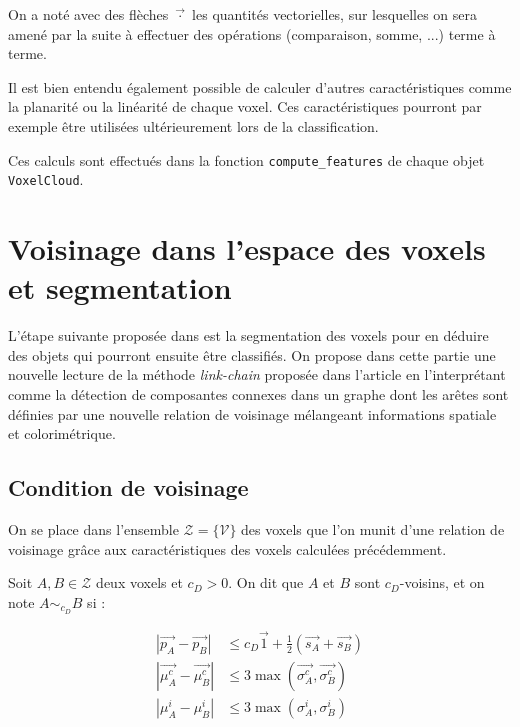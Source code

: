 \documentclass[a4paper, onecolumn, 11pt]{article}
\begin{document}
On a noté avec des flèches $\overrightarrow{\cdot}$ les quantités vectorielles, sur lesquelles on sera amené par la suite à effectuer des opérations (comparaison, somme, ...) terme à terme.

Il est bien entendu également possible de calculer d'autres caractéristiques comme la planarité ou la linéarité de chaque voxel. Ces caractéristiques pourront par exemple être utilisées ultérieurement lors de la classification.

Ces calculs sont effectués dans la fonction \texttt{compute\_features} de chaque objet \texttt{VoxelCloud}.

\section{Voisinage dans l'espace des voxels et segmentation}
L'étape suivante proposée dans \cite{aka_article} est la segmentation des voxels pour en déduire des objets qui pourront ensuite être classifiés. On propose dans cette partie une nouvelle lecture de la méthode \emph{link-chain} proposée dans l'article en l'interprétant comme la détection de composantes connexes dans un graphe dont les arêtes sont définies par une nouvelle relation de voisinage mélangeant informations spatiale et colorimétrique. 


\subsection{Condition de voisinage}
\label{condvoisinage}
On se place dans l'ensemble $\mathcal{Z} = \{\mathcal{V}\}$ des voxels que l'on munit d'une relation de voisinage grâce aux caractéristiques des voxels calculées précédemment.

Soit $A, B \in \mathcal{Z}$ deux voxels et $c_D > 0$. On dit que $A$ et $B$ sont $c_D$-voisins, et on note $A \sim_{c_D} B$ si :

\begin{align}
\left|\overrightarrow{p_A} - \overrightarrow{p_B}\right| &\leq c_D\overrightarrow{1} + \frac{1}{2} \left(\overrightarrow{s_A} + \overrightarrow{s_B}\right)\label{cond1}\\
\left|\overrightarrow{\mu_A^c} - \overrightarrow{\mu_B^c}\right| &\leq 3 \max\left(\overrightarrow{\sigma_A^c}, \overrightarrow{\sigma_B^c}\right)\label{cond2}\\
\left|\mu_A^i - \mu_B^i\right| &\leq 3 \max\left(\sigma_A^i, \sigma_B^i\right)\label{cond3}
\end{align}
\end{document}
